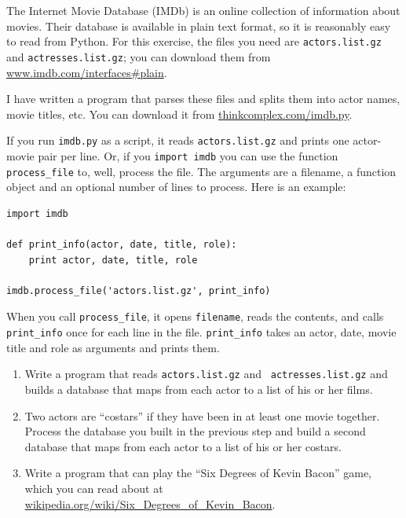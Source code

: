 \documentclass[10pt]{book}
\begin{document}
\begin{ex}


The Internet Movie Database (IMDb) is an online collection of
information about movies.  Their database is available
in plain text format, so it is reasonably easy to read from
Python.  For this exercise, the files you need
are {\tt actors.list.gz} and {\tt actresses.list.gz}; you
can download them from \url{www.imdb.com/interfaces#plain}.


I have written a program that parses these files and
splits them into actor names, movie titles, etc.  You can
download it from \url{thinkcomplex.com/imdb.py}.

If you run {\tt imdb.py} as a script, it reads {\tt actors.list.gz}
and prints one actor-movie pair per line.  Or, if you {\tt import
imdb} you can use the function \verb"process_file" to, well,
process the file.  The arguments are a filename, a function
object and an optional number of lines to process.  Here is
an example:

\beforeverb
\begin{verbatim}
import imdb

def print_info(actor, date, title, role):
    print actor, date, title, role

imdb.process_file('actors.list.gz', print_info)
\end{verbatim}
\afterverb

When you call \verb"process_file", it opens {\tt filename}, reads the
contents, and calls \verb"print_info" once for each line in the file.
\verb"print_info" takes an actor, date, movie title and role as
arguments and prints them.

\begin{enumerate}

\item Write a program that reads {\tt actors.list.gz} and {\tt
  actresses.list.gz} and builds a database
that maps from each actor to a list of his or her films.

\item Two actors are ``costars'' if they have been in at least one
  movie together.  Process the database you built in the previous step
  and build a second database that maps from each actor to a list of
  his or her costars.

\item Write a program that can play the ``Six Degrees of Kevin
  Bacon'' game, which you can read about at
  \url{wikipedia.org/wiki/Six_Degrees_of_Kevin_Bacon}.


\end{enumerate}
\end{ex}
\end{document}

